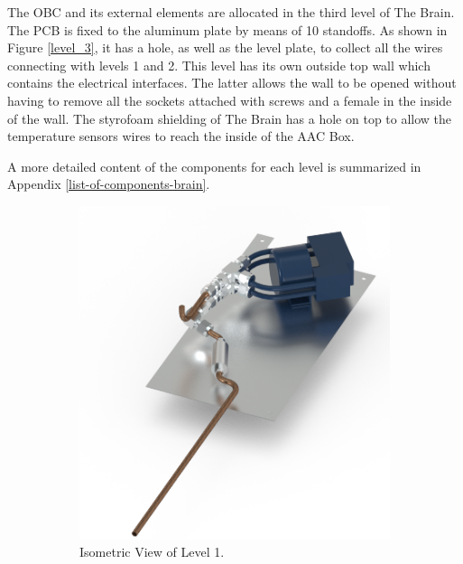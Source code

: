 The OBC and its external elements are allocated in the third level of The Brain. The PCB is fixed to the aluminum plate by means of 10 standoffs. As shown in Figure \ref{level_3}, it has a hole, as well as the level plate, to collect all the wires connecting with levels 1 and 2. This level has its own outside top wall which contains the electrical interfaces. The latter allows the wall to be opened without having to remove all the sockets attached with screws and a female in the inside of the wall. The styrofoam shielding of The Brain has a hole on top to allow the temperature sensors wires to reach the inside of the AAC Box. 

A more detailed content of the components for each level is summarized in Appendix \ref{list-of-components-brain}.
\begin{figure}[H]
    \centering
    \begin{subfigure}[b]{0.3\textwidth}
    \centering
    \includegraphics[width=\textwidth]{4-experiment-design/img/Mechanical/Figure_24a.png}
    \caption{Isometric View of Level 1.}
    \label{level_1}
    \end{subfigure}
    ~
    \begin{subfigure}[b]{0.3\textwidth}
    \centering

\end{subfigure}
\end{figure}

